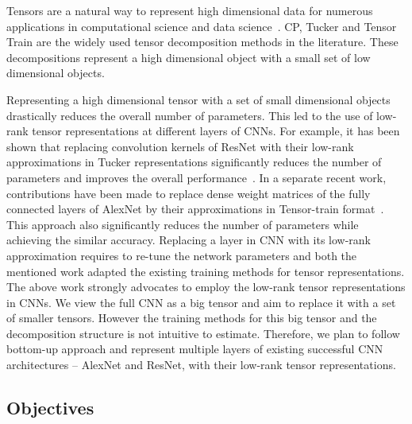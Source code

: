 Tensors are a natural way to represent high dimensional data for numerous applications in computational science and data science~\cite{KB-SIAMReview2009}. 
CP, Tucker and Tensor Train are the widely used tensor decomposition methods in the literature. These decompositions represent a high dimensional object with a small set of low dimensional objects.



Representing a high dimensional tensor with a set of small dimensional objects drastically reduces the overall number of parameters. This led to the use of low-rank tensor representations at different layers of CNNs. For example, it has been shown that replacing convolution kernels of ResNet with their low-rank approximations in Tucker representations significantly reduces the number of parameters and improves the overall performance~\cite{PSSEG+-ECCV2020}. In a separate recent work, contributions have been made to replace dense weight matrices of the fully connected layers of AlexNet by their approximations in Tensor-train format~\cite{NPOV-NIPS2015}. This approach also significantly reduces the number of parameters while achieving the similar accuracy. Replacing a layer in CNN with its low-rank approximation requires to re-tune the network parameters and both the mentioned work adapted the existing training methods for tensor representations. The above work strongly advocates to employ the low-rank tensor representations in CNNs. We view the full CNN as a big tensor and aim to replace it with a set of smaller tensors. However the training methods for this big tensor and the decomposition structure is not intuitive to estimate. Therefore, we plan to follow bottom-up approach and represent multiple layers of existing successful CNN architectures -- AlexNet and ResNet, with their low-rank tensor representations.



\subsection*{Objectives}

